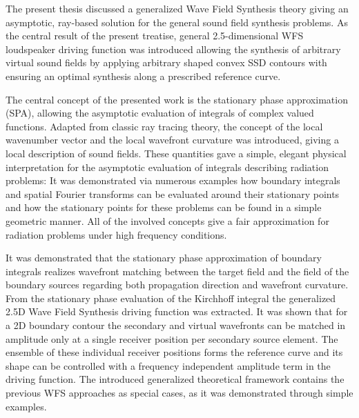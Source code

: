 The present thesis discussed a generalized Wave Field Synthesis theory giving an asymptotic, ray-based solution for the general sound field synthesis problems.
As the central result of the present treatise, general 2.5-dimensional WFS loudspeaker driving function was introduced allowing the synthesis of arbitrary virtual sound fields by applying arbitrary shaped convex SSD contours with ensuring an optimal synthesis along a prescribed reference curve.

The central concept of the presented work is the stationary phase approximation (SPA), allowing the asymptotic evaluation of integrals of complex valued functions.
Adapted from classic ray tracing theory, the concept of the local wavenumber vector and the local wavefront curvature was introduced, giving a local description of sound fields.
These quantities gave a simple, elegant physical interpretation for the asymptotic evaluation of integrals describing radiation problems: 
It was demonstrated via numerous examples how boundary integrals and spatial Fourier transforms can be evaluated around their stationary points and how the stationary points for these problems can be found in a simple geometric manner.
All of the involved concepts give a fair approximation for radiation problems under high frequency conditions.

It was demonstrated that the stationary phase approximation of boundary integrals realizes wavefront matching between the target field and the field of the boundary sources regarding both propagation direction and wavefront curvature.
From the stationary phase evaluation of the Kirchhoff integral the generalized 2.5D Wave Field Synthesis driving function was extracted.
It was shown that for a 2D boundary contour the secondary and virtual wavefronts can be matched in amplitude only at a single receiver position per secondary source element.
The ensemble of these individual receiver positions forms the reference curve and its shape can be controlled with a frequency independent amplitude term in the driving function.
The introduced generalized theoretical framework contains the previous WFS approaches as special cases, as it was demonstrated through simple examples.

